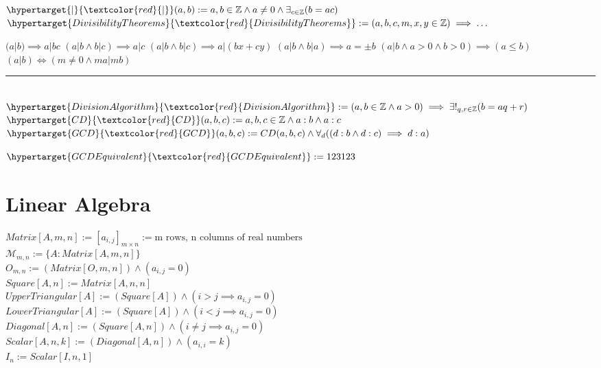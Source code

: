 \documentclass{book}
\newcommand{\df}[1]{\hypertarget{#1}{\textcolor{red}{#1}}}
\newcommand{\abr}{:=}
\begin{document}
$\df{|}(a, b) \abr a, b \in \mathbb{Z} \land a \neq 0 \land \exists_{c \in \mathbb{Z}}(b = a c)$ \\

$\df{Divisibility Theorems} \abr (a, b, c, m, x, y \in \mathbb{Z}) \implies \ldots$
\begin{enumerate}
  \lit $(a | b) \implies a | b c$
  \lit $(a | b \land b | c) \implies a | c$
  \lit $(a | b \land b | c) \implies a | (b x + c y)$
  \lit $(a | b \land b | a) \implies a = \pm b$
  \lit $(a | b \land a > 0 \land b > 0) \implies (a \leq b)$
  \lit $(a | b) \iff (m \neq 0 \land m a | m b)$
\end{enumerate} \vspace{.75mm} \hrule \vspace{.75mm} \ \\ 

$\df{Division Algorithm} \abr (a, b \in \mathbb{Z} \land a > 0) \implies \exists!_{q, r \in \mathbb{Z}}(b = a q + r)$ \\

$\df{CD}(a, b, c) \abr a, b, c \in \mathbb{Z} \land a : b \land a : c$ \\
$\df{GCD}(a, b, c) \abr CD(a, b, c) \land \forall_{d}((d : b \land d : c) \implies d : a)$

$\df{GCD Equivalent} \abr 123123$

\chapter{Linear Algebra}

$Matrix[A, m, n] \abr [a_{i, j}]_{m \times n} \abr \text{m rows, n columns of real numbers}$ \\
$\mathcal{M}_{m, n} \abr \{A : Matrix[A, m, n]\}$ \\
$O_{m, n} \abr (Matrix[O, m, n]) \land (a_{i, j} = 0)$ \\
$Square[A, n] \abr Matrix[A, n, n]$ \\
$UpperTriangular[A] \abr (Square[A]) \land (i > j \implies a_{i, j} = 0)$ \\
$LowerTriangular[A] \abr (Square[A]) \land (i < j \implies a_{i, j} = 0)$ \\
$Diagonal[A, n] \abr (Square[A, n]) \land (i \neq j \implies a_{i, j} = 0)$ \\
$Scalar[A, n, k] \abr (Diagonal[A, n]) \land (a_{i, i} = k)$ \\
$I_n \abr Scalar[I, n, 1]$ \\
\end{document}
